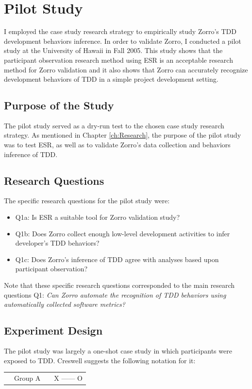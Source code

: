 \chapter{Pilot Study}
\label{ch:Pilot}

I employed the case study research strategy \cite{Yin:03} to empirically study Zorro's TDD development behaviors inference. In order to validate Zorro, I conducted a pilot study at the University of Hawaii in Fall 2005. This study shows that the participant observation research method using ESR is an acceptable research method for Zorro validation and it also shows that Zorro can accurately recognize development behaviors of TDD in a simple project development setting.

\section{Purpose of the Study}
The pilot study served as a dry-run test to the chosen case study research strategy. As mentioned in Chapter \ref{ch:Research}, the purpose of the pilot study was to test ESR, as well as to validate Zorro's data collection and behaviors inference of TDD.

\section{Research Questions}
\label{sec:Pilot-Questions}

The specific research questions for the pilot study were:
\begin{itemize}
 \item Q1a: Is ESR a suitable tool for Zorro validation study?
 \item Q1b: Does Zorro collect enough low-level development activities to
   infer developer's TDD behaviors?
 \item Q1c: Does Zorro's inference of TDD agree with analyses based upon
   participant observation?
\end{itemize}

Note that these specific research questions corresponded to the main research questions Q1: \textit{Can Zorro automate the recognition of TDD behaviors using automatically collected software metrics?}

\section{Experiment Design}
\label{sec:Pilot-Design}
The pilot study was largely a one-shot case study in which participants were exposed to TDD. Creswell \cite{Creswell:03} suggests the following notation for it:
  \begin{tabular}{p{0.5cm}lp{1cm}l} 
    & Group A  & & X ------ O
  \end{tabular}

